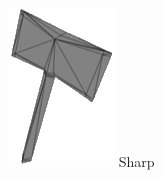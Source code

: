 \begin{frame}
\begin{columns}
\begin{column}[b]{0.22\textwidth}
\begin{center}
				\includegraphics[width=\textwidth]{./img/2_mesh/sharpAxeMesh.png}
				\small{Sharp}
			\end{center}	
		\end{column}
		\begin{column}[b]{0.22\textwidth}
			\begin{center}

\end{center}
\end{column}
\end{columns}
\end{frame}
